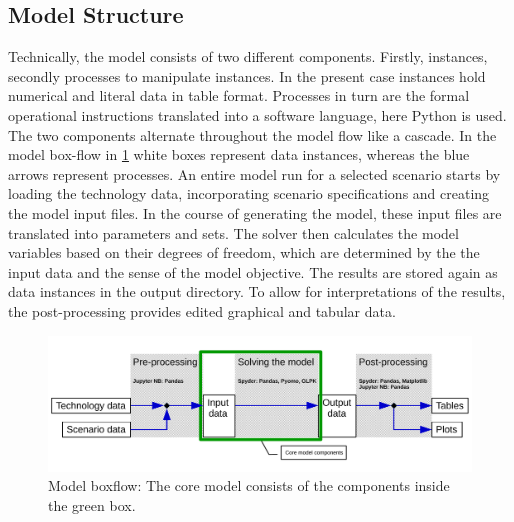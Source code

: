\documentclass[article]{elsarticle}
\begin{document}
\subsection{Model Structure}
\label{subsec:Structure}
Technically, the model consists of two different components. Firstly, instances, secondly processes to manipulate instances. In the present case instances hold numerical and literal data in table format. Processes in turn are the formal operational instructions translated into a software language, here Python is used. The two components alternate throughout the model flow like a cascade. In the model box-flow in \cref{fig:model_boxflow} white boxes represent data instances, whereas the blue arrows represent processes. An entire model run for a selected scenario starts by loading the technology data, incorporating scenario specifications and creating the model input files. In the course of generating the model, these input files are translated into parameters and sets. The solver then calculates the model variables based on their degrees of freedom, which are determined by the the input data and the sense of the model objective. The results are stored again as data instances in the output directory. To allow for interpretations of the results, the post-processing provides edited graphical and tabular data.

\begin{figure}[tbh]
    \centering
    \includegraphics[width=\textwidth]{figures/model_boxflow_paper.pdf}
    \caption{Model boxflow: The core model consists of the components inside the green box.}
    \label{fig:model_boxflow}
\end{figure}
\end{document}
